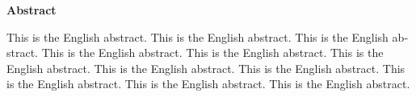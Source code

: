 \documentclass[sommairechap,stylejchiquet]{these_gi}
\begin{document}
\begin{otherlanguage}{english}

\begin{center}
\textbf{Abstract}
\end{center}

This is the English abstract. This is the English abstract. This is the English abstract. This is the English abstract. This is the English abstract. This is the English abstract. This is the English abstract. This is the English abstract. This is the English abstract. This is the English abstract. This is the English abstract. 
\end{otherlanguage}
\end{document}
